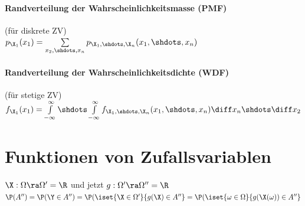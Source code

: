 \documentclass[german,color,6pt]{latex4ei/latex4ei_sheet}
\begin{document}
\begin{sectionbox}
	\paragraph{Randverteilung der Wahrscheinlichkeitsmasse (PMF)}
	(für diskrete ZV) \\
	$p_{\X_1}(x_1) = \sum\limits_{x_2,\shdots,x_n}{p_{\X_1,\shdots,\X_n}(x_1,\shdots,x_n)}$
	
	\paragraph{Randverteilung der Wahrscheinlichkeitsdichte (WDF)} (für stetige ZV) \\
	$f_{\X_1}(x_1) = \int\limits_{-\infty}^{\infty}{\shdots\int\limits_{-\infty}^{\infty}{f_{\X_1,\shdots,\X_n}(x_1,\shdots,x_n)\diff x_n\shdots}\diff x_2}$
\end{sectionbox}



\section{Funktionen von Zufallsvariablen}
\begin{sectionbox}
	$\X: \Omega \ra \Omega' = \R$ und jetzt $g:\Omega' \ra \Omega'' = \R$\\
	$\P(A'') = \P(\Y \in A'') = \P(\iset{\X \in \Omega'}{g(\X) \in A''} = \P(\iset{\omega \in \Omega}{g(\X(\omega)) \in A''}$
\end{sectionbox}
\end{document}
